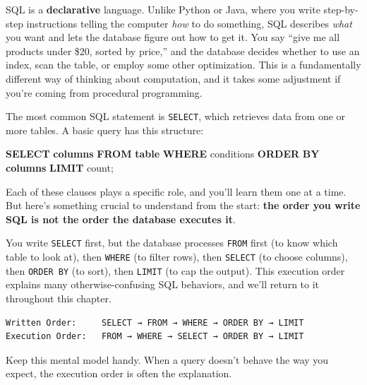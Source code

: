 \documentclass[
  letterpaper,
  DIV=11,
  numbers=noendperiod]{scrreprt}
\newenvironment{Shaded}{\begin{snugshade}}{\end{snugshade}}
\newcommand{\FunctionTok}[1]{\textcolor[rgb]{0.28,0.35,0.67}{#1}}
\newcommand{\KeywordTok}[1]{\textcolor[rgb]{0.00,0.23,0.31}{\textbf{#1}}}
\newcommand{\NormalTok}[1]{\textcolor[rgb]{0.00,0.23,0.31}{#1}}
\begin{document}
SQL is a \textbf{declarative} language. Unlike Python or Java, where you
write step-by-step instructions telling the computer \emph{how} to do
something, SQL describes \emph{what} you want and lets the database
figure out how to get it. You say ``give me all products under \$20,
sorted by price,'' and the database decides whether to use an index,
scan the table, or employ some other optimization. This is a
fundamentally different way of thinking about computation, and it takes
some adjustment if you're coming from procedural programming.

The most common SQL statement is \texttt{SELECT}, which retrieves data
from one or more tables. A basic query has this structure:

\begin{codelisting}

\caption{\texttt{duckdb}}

\begin{Shaded}
\begin{Highlighting}[]
\KeywordTok{SELECT} \KeywordTok{columns}
\KeywordTok{FROM} \KeywordTok{table}
\KeywordTok{WHERE}\NormalTok{ conditions}
\KeywordTok{ORDER} \KeywordTok{BY} \KeywordTok{columns}
\KeywordTok{LIMIT} \FunctionTok{count}\NormalTok{;}
\end{Highlighting}
\end{Shaded}

\end{codelisting}

Each of these clauses plays a specific role, and you'll learn them one
at a time. But here's something crucial to understand from the start:
\textbf{the order you write SQL is not the order the database executes
it}.

You write \texttt{SELECT} first, but the database processes
\texttt{FROM} first (to know which table to look at), then
\texttt{WHERE} (to filter rows), then \texttt{SELECT} (to choose
columns), then \texttt{ORDER\ BY} (to sort), then \texttt{LIMIT} (to cap
the output). This execution order explains many otherwise-confusing SQL
behaviors, and we'll return to it throughout this chapter.

\begin{verbatim}
Written Order:     SELECT → FROM → WHERE → ORDER BY → LIMIT
Execution Order:   FROM → WHERE → SELECT → ORDER BY → LIMIT
\end{verbatim}

Keep this mental model handy. When a query doesn't behave the way you
expect, the execution order is often the explanation.
\end{document}
